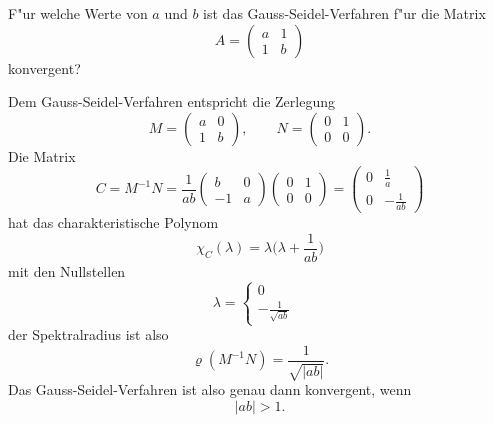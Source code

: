 F"ur welche Werte von $a$ und $b$ ist das Gauss-Seidel-Verfahren f"ur die
Matrix
\[
A=\begin{pmatrix}
a&1\\
1&b
\end{pmatrix}
\]
konvergent?

\begin{loesung}
Dem Gauss-Seidel-Verfahren entspricht die Zerlegung
\[
M=\begin{pmatrix}a&0\\1&b\end{pmatrix},\qquad
N=\begin{pmatrix}0&1\\0&0\end{pmatrix}.
\]
Die Matrix
\[
C=M^{-1}N
=
\frac1{ab}
\begin{pmatrix}b&0\\-1&a\end{pmatrix}
\begin{pmatrix}0&1\\0&0\end{pmatrix}
=
\begin{pmatrix}
0&\frac1a\\0&-\frac1{ab}
\end{pmatrix}
\]
hat das charakteristische Polynom
\[
\chi_C(\lambda)=\lambda\biggl(\lambda +\frac1{ab}\biggr)
\]
mit den Nullstellen
\[
\lambda=\begin{cases}
0&\\
\displaystyle
-\frac1{\sqrt{ab}}&
\end{cases}
\]
der Spektralradius ist also
\[
\varrho(M^{-1}N)=\frac1{\sqrt{|ab|}}.
\]
Das Gauss-Seidel-Verfahren ist also genau dann konvergent, wenn
\[
|ab| > 1.
\]
\end{loesung}

